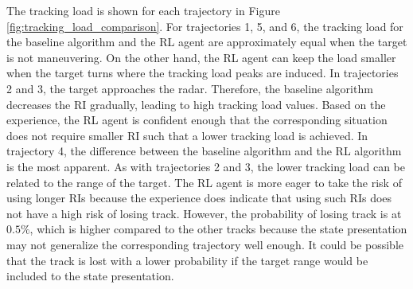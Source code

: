\documentclass[english, 12pt, a4paper, elec, utf8, a-1b, online]{aaltothesis}
\begin{document}
The tracking load is shown for each trajectory in Figure \ref{fig:tracking_load_comparison}.
For trajectories 1, 5, and 6, the tracking load for the baseline algorithm and the RL agent are approximately equal when the target is not maneuvering.
On the other hand, the RL agent can keep the load smaller when the target turns where the tracking load peaks are induced.
In trajectories 2 and 3, the target approaches the radar. 
Therefore, the baseline algorithm decreases the RI gradually, leading to high tracking load values.
Based on the experience, the RL agent is confident enough that the corresponding situation does not require smaller RI such that a lower tracking load is achieved.
In trajectory 4, the difference between the baseline algorithm and the RL algorithm is the most apparent.
As with trajectories 2 and 3, the lower tracking load can be related to the range of the target.
The RL agent is more eager to take the risk of using longer RIs because the experience does indicate that using such RIs does not have a high risk of losing track.
However, the probability of losing track is at $0.5\%$, which is higher compared to the other tracks because the state presentation may not generalize the corresponding trajectory well enough.
It could be possible that the track is lost with a lower probability if the target range would be included to the state presentation.
\end{document}
